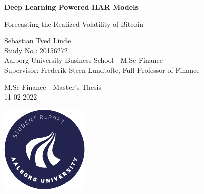 \documentclass[11pt, a4paper, openright]{report}
\author{Sebastian Tved Linde}
\date{\today}
\title{}
\begin{document}
\begin{titlepage}
\vspace*{\fill}
  \noindent%
    \begin{center}
    \Huge{\textbf{
          Deep Learning Powered HAR Models
          }}
    \end{center}
    \begin{center}
      \Large{
      Forecasting the Realized Volatility of Bitcoin
      }
    \end{center}
    \vspace{0.2cm}
   \begin{center}
    {\Large
      Sebastian Tved Linde
    }\\
    \vspace{0.2cm}
    {\large
    Study No.: 20156272
    }\\
    \vspace{0.2cm}
    {\large
      Aalborg University Business School - M.Sc Finance
    }\\
   \vspace{0.2cm}
   {\large
   Supervisor: Frederik Steen Lundtofte, Full Professor of Finance 
   }

   \end{center}

   \vspace{0.2cm}
   \begin{center}
    {\Large
     M.Sc Finance - Master's Thesis
    }\\
   \vspace{0.2cm}
   {\Large
   11-02-2022
   }
   \end{center}
  \vfill
  \begin{center}
    \includegraphics[width=0.2\paperwidth]{aauGraphics/aau_logo_circle_en}%
  \end{center}
\end{titlepage}
\clearpage
\end{document}
